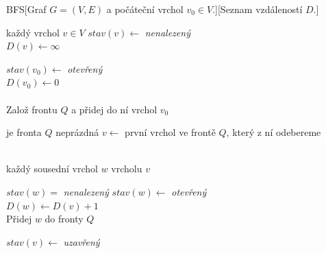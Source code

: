 \begin{pseudo}{BFS}[Graf $G=(V,E)$ a počáteční vrchol $v_0\in V$.][Seznam vzdáleností $D$.]
    \begin{For}{každý vrchol $v\in V$}
        $stav(v)\gets$ \textit{nenalezený}\\
        $D(v)\gets\infty$
    \end{For}
    $stav(v_0)\gets$ \textit{otevřený}\\
    $D(v_0)\gets 0$\\\\
    Založ frontu $Q$ a přidej do ní vrchol $v_0$\\
    \begin{While}{je fronta $Q$ neprázdná}
        $v\gets$ první vrchol ve frontě $Q$, který z ní odebereme\\\\
        \begin{For}{každý sousední vrchol $w$ vrcholu $v$}
            \begin{If}{$stav(w)=$ \textit{nenalezený}}
                $stav(w)\gets$ \textit{otevřený}\\
                $D(w)\gets D(v)+1$\\
                Přidej $w$ do fronty $Q$
            \end{If}
        \end{For}
        $stav(v)\gets$ \textit{uzavřený}
    \end{While}
\end{pseudo}

